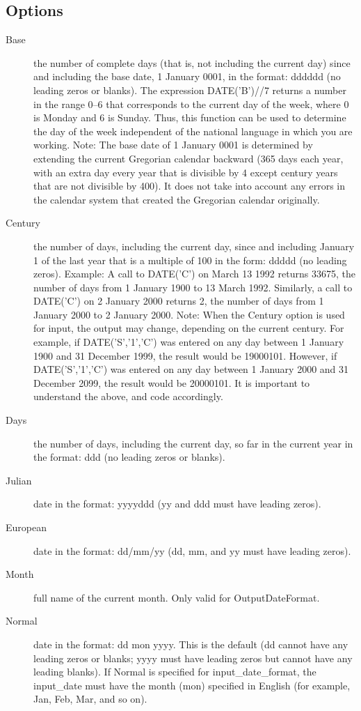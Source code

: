 \subsection{Options}
\begin{description}
\item[Base]
  the number of complete days (that is, not including the current day) since and including the base date, 1 January 0001, in the format: dddddd (no leading zeros or blanks). The expression DATE('B')//7 returns a number in the range 0–6 that corresponds to the current day of the week, where 0 is Monday and 6 is Sunday.
Thus, this function can be used to determine the day of the week independent of the national language in which you are working.
Note: The base date of 1 January 0001 is determined by extending the current Gregorian calendar backward (365 days each year, with an extra day every year that is divisible by 4 except century years that are not divisible by 400). It does not take into account any errors in the calendar system that created the Gregorian calendar originally.
\item[Century]
the number of days, including the current day, since and including January 1 of the last year that is a multiple of 100 in the form: ddddd (no leading zeros). Example: A call to DATE('C') on March 13 1992 returns 33675, the number of days from 1 January 1900 to 13 March 1992. Similarly, a call to DATE('C') on 2 January 2000 returns 2, the number of days from 1 January 2000 to 2 January 2000.
Note: When the Century option is used for input, the output may change, depending on the current century. For example, if DATE('S','1','C') was entered on any day between 1 January 1900 and 31 December 1999, the result would be 19000101. However, if DATE('S','1','C') was entered on any day between 1 January 2000 and 31 December 2099, the result would be 20000101. It is important to understand the above, and code accordingly.
\item[Days]
the number of days, including the current day, so far in the current year in the format: ddd (no leading zeros or blanks).
\item[Julian]
  date in the format: yyyyddd (yy and ddd must have leading zeros).
 \item[European]
    date in the format: dd/mm/yy (dd, mm, and yy must have leading zeros).
\item[Month]
full name of the current month. Only valid for OutputDateFormat.
\item[Normal]
date in the format: dd mon yyyy. This is the default (dd cannot have any leading zeros or blanks; yyyy must have leading zeros but cannot have any leading blanks). If Normal is specified for input\_date\_format, the input\_date must have the month (mon) specified in English (for example, Jan, Feb, Mar, and so on).

\end{description}
